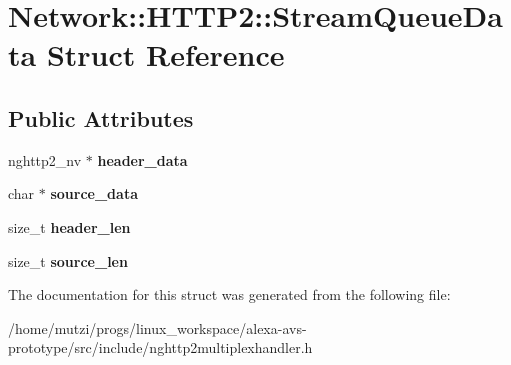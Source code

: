 \hypertarget{structNetwork_1_1HTTP2_1_1StreamQueueData}{}\section{Network\+:\+:H\+T\+T\+P2\+:\+:Stream\+Queue\+Data Struct Reference}
\label{structNetwork_1_1HTTP2_1_1StreamQueueData}
\subsection*{Public Attributes}
\begin{DoxyCompactItemize}
\item 
\mbox{\label{structNetwork_1_1HTTP2_1_1StreamQueueData_a1c68711a4f22b732630accd4f574efc0}} 
nghttp2\+\_\+nv $\ast$ {\bfseries header\+\_\+data}
\item 
\mbox{\label{structNetwork_1_1HTTP2_1_1StreamQueueData_a7c3e7909a7c09c3ff37664a5f0d8c74a}} 
char $\ast$ {\bfseries source\+\_\+data}
\item 
\mbox{\label{structNetwork_1_1HTTP2_1_1StreamQueueData_acc80b01bfd60041e2e70d25fb32261b0}} 
size\+\_\+t {\bfseries header\+\_\+len}
\item 
\mbox{\label{structNetwork_1_1HTTP2_1_1StreamQueueData_a9ee58c0936ac2bb080c6aab2362f2541}} 
size\+\_\+t {\bfseries source\+\_\+len}
\end{DoxyCompactItemize}


The documentation for this struct was generated from the following file\+:\begin{DoxyCompactItemize}
\item 
/home/mutzi/progs/linux\+\_\+workspace/alexa-\/avs-\/prototype/src/include/nghttp2multiplexhandler.\+h\end{DoxyCompactItemize}
